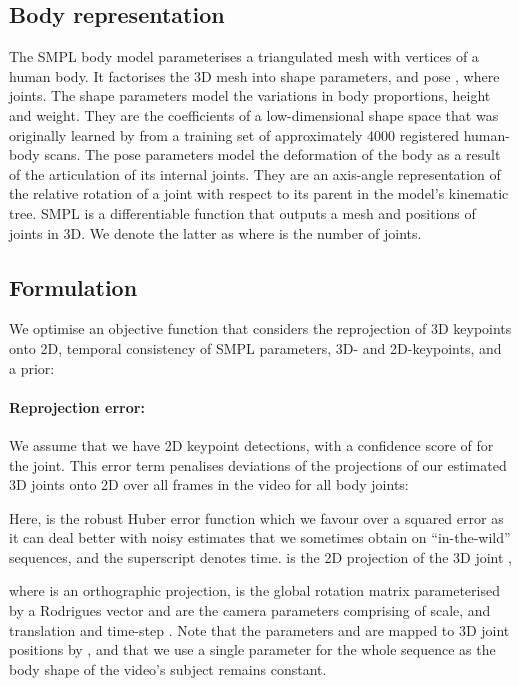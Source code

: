 \documentclass[10pt,twocolumn,letterpaper]{article}
\begin{document}
\subsection{Body representation}
\label{sec:body_model}

The SMPL body model \cite{loper_tog_2015} parameterises a triangulated mesh with  vertices of a human body.
It factorises the 3D mesh into shape parameters,  and pose , where  joints.
The shape parameters model the variations in body proportions, height and weight.
They are the coefficients of a low-dimensional shape space that was originally learned by \cite{loper_tog_2015, bogo_eccv_2016} from a training set of approximately 4000 registered human-body scans.
The pose parameters model the deformation of the body as a result of the articulation of its  internal joints.
They are an axis-angle representation of the relative rotation of a joint with respect to its parent in the model's kinematic tree.
SMPL is a differentiable function that outputs a mesh and positions of joints in 3D.
We denote the latter as  where  is the number of joints.

\subsection{Formulation}
\label{sec:formulation}

We optimise an objective function that considers the reprojection of 3D keypoints onto 2D, temporal consistency of SMPL parameters, 3D- and 2D-keypoints, and a prior:


\paragraph{Reprojection error:}
We assume that we have 2D keypoint detections,  with a confidence score of  for the  joint. 
This error term penalises deviations of the projections of our estimated 3D joints onto 2D over all  frames in the video for all  body joints:

Here,  is the robust Huber error function which we favour over a squared error as it can deal better with noisy estimates that we sometimes obtain on ``in-the-wild'' sequences, and the superscript  denotes time.
 is the 2D projection of the 3D joint ,

where  is an orthographic projection,  is the global rotation matrix parameterised by a Rodrigues vector and  are the camera parameters comprising of scale,  and translation  and time-step . 
Note that the parameters  and  are mapped to 3D joint positions  by , and that we use a single  parameter for the whole sequence as the body shape of the video's subject remains constant.
    
\end{document}
